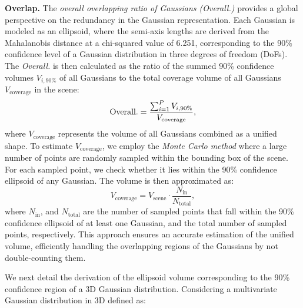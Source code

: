 \textbf{Overlap.} 
The \textit{overall overlapping ratio of Gaussians (Overall.)} provides a global perspective on the redundancy in the Gaussian representation. 
Each Gaussian is modeled as an ellipsoid, where the semi-axis lengths are derived from the Mahalanobis distance at a chi-squared value of 6.251, corresponding to the 90\% confidence level of a Gaussian distribution in three degrees of freedom (DoFs).
The \textit{Overall.} is then calculated as the ratio of the summed 90\% confidence volumes $V_{i,90\%}$ of all Gaussians to the total coverage volume of all Gaussians $V_{\text{coverage}}$ in the scene:
\begin{equation}
    {\rm Overall.} = \frac{\sum_{i=1}^{P} V_{i,90\%}}{V_{\text{coverage}}}, 
    \label{eq: Overall.}
\end{equation}
where $V_{\text{coverage}}$ represents the volume of all Gaussians combined as a unified shape. To estimate $V_{\text{coverage}}$, we employ the \textit{Monte Carlo method} where a large number of points are randomly sampled within the bounding box of the scene. For each sampled point, we check whether it lies within the 90\% confidence ellipsoid of any Gaussian. The volume is then approximated as:
\begin{equation}
    V_{\text{coverage}} = V_{\text{scene}} \cdot \frac{N_{\text{in}}}{N_{\text{total}}},
    \label{eq: Monte}
\end{equation}where $N_{\text{in}}$, and $N_{\text{total}}$ are the number of sampled points that fall within the 90\% confidence ellipsoid of at least one Gaussian, and the total number of sampled points, respectively. This approach ensures an accurate estimation of the unified volume, efficiently handling the overlapping regions of the Gaussians by not double-counting them.

We next detail the derivation of the ellipsoid volume corresponding to the 90\% confidence region of a 3D Gaussian distribution. 
Considering a multivariate Gaussian distribution in 3D defined as:

